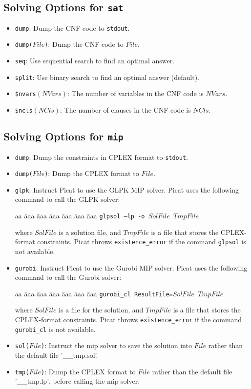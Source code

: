 \subsection{Solving Options for \texttt{sat}}
\begin{itemize}
\item \texttt{dump}: Dump the CNF code to \texttt{stdout}.
\item \texttt{dump($File$)}: Dump the CNF code to $File$.
\item \texttt{seq}: Use sequential search to find an optimal answer.
\item \texttt{split}: Use binary search to find an optimal answer (default).
\item \texttt{\$nvars$(NVars)$}: The number of variables in the CNF code is $NVars$.
\item \texttt{\$ncls$(NCls)$}: The number of clauses in the CNF code is $NCls$.
\end{itemize}

\subsection{Solving Options for \texttt{mip}}
\begin{itemize}
\item \texttt{dump}: Dump the constraints in CPLEX format to \texttt{stdout}.
\item \texttt{dump($File$)}: Dump the CPLEX format to $File$.
\item \texttt{glpk}: Instruct Picat to use the GLPK MIP solver. Picat uses the following command to call the GLPK solver:
\begin{tabbing}
aa \= aaa \= aaa \= aaa \= aaa \= aaa \= aaa \kill
\> \texttt{glpsol --lp -o $SolFile$ $TmpFile$}
\end{tabbing}
where $SolFile$ is a solution file, and $TmpFile$ is a file that stores the CPLEX-format constraints. Picat throws \texttt{existence\_error} if the command \texttt{glpsol} is not available.
\item \texttt{gurobi}: Instruct Picat to use the Gurobi MIP solver. Picat uses the following command to call the Gurobi solver:
\begin{tabbing}
aa \= aaa \= aaa \= aaa \= aaa \= aaa \= aaa \kill
\> \texttt{gurobi\_cl ResultFile=$SolFile$ $TmpFile$}
\end{tabbing}
where $SolFile$ is a file for the solution, and $TmpFile$ is a file that stores the CPLEX-format constraints. Picat throws \texttt{existence\_error} if the command \texttt{gurobi\_cl} is not available.
\item \texttt{sol($File$)}: Instruct the mip solver to save the solution into $File$ rather than the default file '\_\_tmp.sol'.
\item \texttt{tmp($File$)}: Dump the CPLEX format to $File$ rather than the default file '\_\_tmp.lp', before calling the mip solver.
\end{itemize}
\ignore{

}
